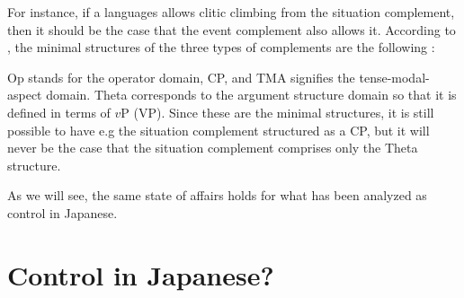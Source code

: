\documentclass[output=paper]{langsci/langscibook}
\begin{document}
\begin{table}
\caption{Implicational complementation hierarchy}
\label{shimamutab:1:ICH}
\end{table}

For instance, if a languages allows clitic climbing from the situation complement, then it should be the case that the event complement also allows it. According to \citet{wurmbrandlohninger2020}, the minimal structures of the three types of complements are the following \citep[][33]{wurmbrandlohninger2020}:

\begin{multicols}{3}
\ea\label{shimamu4.1}
\begin{xlist} 
\ex {}
\ex {}
\ex {}
\end{xlist}
\z
\end{multicols}

\noindent Op stands for the operator domain, CP, and TMA signifies the tense-modal-as\-pect domain. Theta corresponds to the argument structure domain so that it is defined in terms of $v$P (VP). Since these are the minimal structures, it is still possible to have e.g the situation complement structured as a CP, but it will never be the case that the situation complement comprises only the Theta structure.

As we will see, the same state of affairs holds for what has been analyzed as control in Japanese.

\section{Control in Japanese?}\label{shimamuS3}
\end{document}

